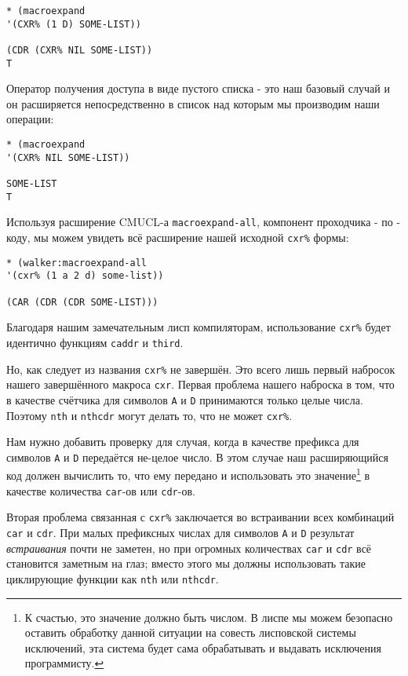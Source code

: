 \begin{verbatim}
* (macroexpand
'(CXR% (1 D) SOME-LIST))

(CDR (CXR% NIL SOME-LIST))
T
\end{verbatim}

Оператор получения доступа в виде пустого списка - это наш базовый случай и он расширяется непосредственно в список над которым мы производим наши операции:

\begin{verbatim}
* (macroexpand
'(CXR% NIL SOME-LIST))

SOME-LIST
T
\end{verbatim}

Используя расширение CMUCL-а \verb"macroexpand-all", компонент проходчика - по - коду, мы можем увидеть всё расширение нашей исходной \verb"cxr%" формы:

\begin{verbatim}
* (walker:macroexpand-all
'(cxr% (1 a 2 d) some-list))

(CAR (CDR (CDR SOME-LIST)))
\end{verbatim}

Благодаря нашим замечательным лисп компиляторам, использование \verb"cxr%" будет идентично функциям \verb"caddr" и \verb"third".

Но, как следует из названия \verb"cxr%" не завершён. Это всего лишь первый набросок нашего завершённого макроса \verb"cxr". Первая проблема нашего наброска в том, что в качестве счётчика для символов \verb"A" и \verb"D" принимаются только целые числа. Поэтому \verb"nth" и \verb"nthcdr" могут делать то, что не может \verb"cxr%".

Нам нужно добавить проверку для случая, когда в качестве префикса для символов \verb"A" и \verb"D" передаётся не-целое число. В этом случае наш расширяющийся код должен вычислить то, что ему передано и использовать это значение\footnote{К счастью, это значение должно быть числом. В лиспе мы можем безопасно оставить обработку данной ситуации на совесть лисповской системы исключений, эта система будет сама обрабатывать и выдавать исключения программисту.} в качестве количества \verb"car"-ов или \verb"cdr"-ов.



Вторая проблема связанная с \verb"cxr%" заключается во встраивании всех комбинаций \verb"car" и \verb"cdr". При малых префиксных числах для символов \verb"A" и \verb"D" результат \emph{встраивания} почти не заметен, но при огромных количествах \verb"car" и \verb"cdr" всё становится заметным на глаз; вместо этого мы должны использовать такие циклирующие функции как \verb"nth" или \verb"nthcdr".


